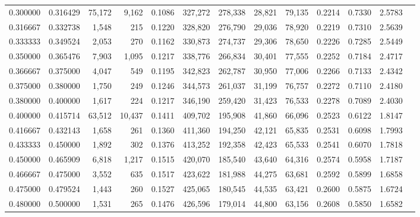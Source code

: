 \begin{tabular}{rrrrrrrrrrrrr}
0.300000 & 0.316429 & 75,172 &  9,162 &                                     0.1086 & 327,272 & 278,338 &  28,821 &  79,135 & 0.2214 & 0.7330 & 2.5783 \\
0.316667 & 0.332738 &  1,548 &    215 &                                     0.1220 & 328,820 & 276,790 &  29,036 &  78,920 & 0.2219 & 0.7310 & 2.5639 \\
0.333333 & 0.349524 &  2,053 &    270 &                                     0.1162 & 330,873 & 274,737 &  29,306 &  78,650 & 0.2226 & 0.7285 & 2.5449 \\
0.350000 & 0.365476 &  7,903 &  1,095 &                                     0.1217 & 338,776 & 266,834 &  30,401 &  77,555 & 0.2252 & 0.7184 & 2.4717 \\
0.366667 & 0.375000 &  4,047 &    549 &                                     0.1195 & 342,823 & 262,787 &  30,950 &  77,006 & 0.2266 & 0.7133 & 2.4342 \\
0.375000 & 0.380000 &  1,750 &    249 &                                     0.1246 & 344,573 & 261,037 &  31,199 &  76,757 & 0.2272 & 0.7110 & 2.4180 \\
0.380000 & 0.400000 &  1,617 &    224 &                                     0.1217 & 346,190 & 259,420 &  31,423 &  76,533 & 0.2278 & 0.7089 & 2.4030 \\
0.400000 & 0.415714 & 63,512 & 10,437 &                                     0.1411 & 409,702 & 195,908 &  41,860 &  66,096 & 0.2523 & 0.6122 & 1.8147 \\
0.416667 & 0.432143 &  1,658 &    261 &                                     0.1360 & 411,360 & 194,250 &  42,121 &  65,835 & 0.2531 & 0.6098 & 1.7993 \\
0.433333 & 0.450000 &  1,892 &    302 &                                     0.1376 & 413,252 & 192,358 &  42,423 &  65,533 & 0.2541 & 0.6070 & 1.7818 \\
0.450000 & 0.465909 &  6,818 &  1,217 &                                     0.1515 & 420,070 & 185,540 &  43,640 &  64,316 & 0.2574 & 0.5958 & 1.7187 \\
0.466667 & 0.475000 &  3,552 &    635 &                                     0.1517 & 423,622 & 181,988 &  44,275 &  63,681 & 0.2592 & 0.5899 & 1.6858 \\
0.475000 & 0.479524 &  1,443 &    260 &                                     0.1527 & 425,065 & 180,545 &  44,535 &  63,421 & 0.2600 & 0.5875 & 1.6724 \\
0.480000 & 0.500000 &  1,531 &    265 &                                     0.1476 & 426,596 & 179,014 &  44,800 &  63,156 & 0.2608 & 0.5850 & 1.6582 \\

\end{tabular}
